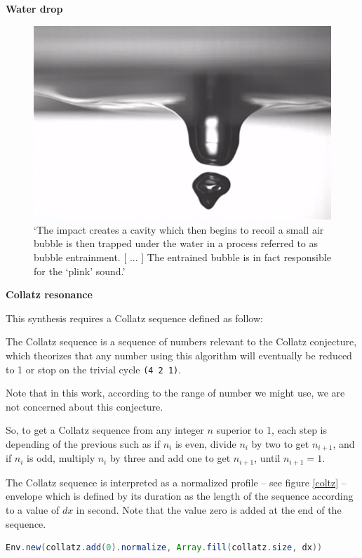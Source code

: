 \noindent  \textbf{
  Water drop }
  
\label{wd}

\smallskip

\begin{figure}[H]
\begin{center}
\includegraphics[width=0.65\linewidth]{img/3187} 
\caption{`The impact creates a cavity which then begins to recoil a small air bubble is then trapped under the water in a process referred to as bubble entrainment. [ ... ] The entrained bubble is in fact responsible for the `plink' sound.' \citep{sdw}}
\label{dropwater}
\end{center}
\end{figure}

\noindent \textbf{
  Collatz resonance }

\label{colres}

\smallskip
This synthesis requires a Collatz sequence defined as follow:

{The Collatz sequence is a sequence of numbers relevant to the Collatz conjecture, which theorizes that any number using this algorithm will eventually be reduced to 1 or stop on the trivial cycle \texttt{(4 2 1)}.

Note that in this work, according to the range of number we might use, we are not concerned about this conjecture.

So, to get a Collatz sequence from any integer $n$ superior to 1, each step is depending of the previous such as if $n_i$ is even, divide $n_i$ by two to get $n_{i+1}$, and if $n_i$ is odd, multiply $n_i$ by three and add one to get $n_{i+1}$, until $n_{i+1}=1$. 
} 


The Collatz sequence is interpreted as a normalized profile -- see figure \ref{coltz} -- envelope which is defined by its duration as the length of the sequence according to a value of $dx$ in second. Note that the value zero is added at the end of the sequence.
\begin{lstlisting}[basicstyle=\footnotesize\ttfamily,language=Java]
Env.new(collatz.add(0).normalize, Array.fill(collatz.size, dx))
\end{lstlisting} 

